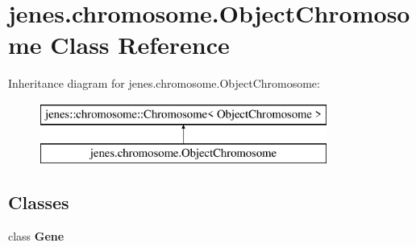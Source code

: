 \hypertarget{classjenes_1_1chromosome_1_1_object_chromosome}{\section{jenes.\-chromosome.\-Object\-Chromosome Class Reference}
\label{classjenes_1_1chromosome_1_1_object_chromosome}
}
Inheritance diagram for jenes.\-chromosome.\-Object\-Chromosome\-:\begin{figure}[H]
\begin{center}
\leavevmode
\includegraphics[height=2.000000cm]{classjenes_1_1chromosome_1_1_object_chromosome}
\end{center}
\end{figure}
\subsection*{Classes}
\begin{DoxyCompactItemize}
\item 
class {\bfseries Gene}
\end{DoxyCompactItemize}
